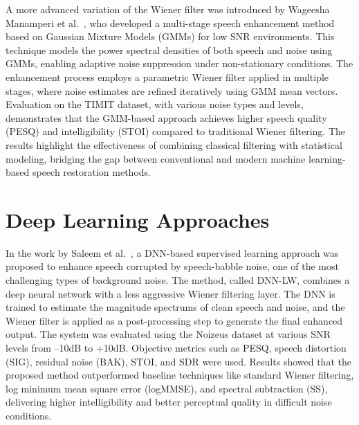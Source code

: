 \vspace{1em}

A more advanced variation of the Wiener filter was introduced by Wageesha Manamperi et al.~\cite{gmm-manamperi}, who developed a multi-stage speech enhancement method based on Gaussian Mixture Models (GMMs) for low SNR environments. This technique models the power spectral densities of both speech and noise using GMMs, enabling adaptive noise suppression under non-stationary conditions. The enhancement process employs a parametric Wiener filter applied in multiple stages, where noise estimates are refined iteratively using GMM mean vectors. Evaluation on the TIMIT dataset, with various noise types and levels, demonstrates that the GMM-based approach achieves higher speech quality (PESQ) and intelligibility (STOI) compared to traditional Wiener filtering. The results highlight the effectiveness of combining classical filtering with statistical modeling, bridging the gap between conventional and modern machine learning-based speech restoration methods.

\section{Deep Learning Approaches}


In the work by Saleem et al.~\cite{saleem2018dnnlw}, a DNN-based supervised learning approach was proposed to enhance speech corrupted by speech-babble noise, one of the most challenging types of background noise. The method, called DNN-LW, combines a deep neural network with a less aggressive Wiener filtering layer. The DNN is trained to estimate the magnitude spectrums of clean speech and noise, and the Wiener filter is applied as a post-processing step to generate the final enhanced output. The system was evaluated using the Noizeus dataset at various SNR levels from –10dB to +10dB. Objective metrics such as PESQ,  speech distortion (SIG), residual noise (BAK), STOI, and SDR were used. Results showed that the proposed method outperformed baseline techniques like standard Wiener filtering, log minimum mean square error (logMMSE), and spectral subtraction (SS), delivering higher intelligibility and better perceptual quality in difficult noise conditions.

\vspace{1em}

